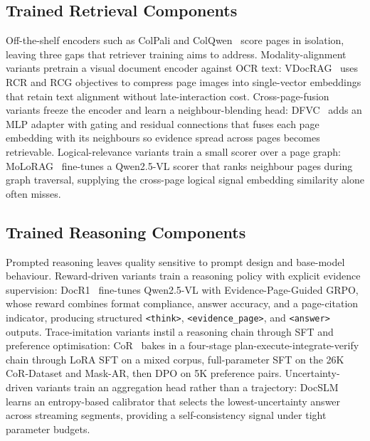 \documentclass[11pt]{article}
\begin{document}
\subsection{Trained Retrieval Components}
\label{sec:train-retrieval}
Off-the-shelf encoders such as ColPali and ColQwen~\cite{Faysse2024-wq} score pages in isolation, leaving three gaps that retriever training aims to address. Modality-alignment variants pretrain a visual document encoder against OCR text: VDocRAG~\cite{tanaka2025vdocrag} uses RCR and RCG objectives to compress page images into single-vector embeddings that retain text alignment without late-interaction cost. Cross-page-fusion variants freeze the encoder and learn a neighbour-blending head: DFVC~\cite{qian2026accurate} adds an MLP adapter with gating and residual connections that fuses each page embedding with its neighbours so evidence spread across pages becomes retrievable. Logical-relevance variants train a small scorer over a page graph: MoLoRAG~\cite{wu2025molorag} fine-tunes a Qwen2.5-VL scorer that ranks neighbour pages during graph traversal, supplying the cross-page logical signal embedding similarity alone often misses.


\subsection{Trained Reasoning Components} %
\label{sec:train-reasoning}
Prompted reasoning leaves quality sensitive to prompt design and base-model behaviour. Reward-driven variants train a reasoning policy with explicit evidence supervision: DocR1~\cite{xiong2026docr1} fine-tunes Qwen2.5-VL with Evidence-Page-Guided GRPO, whose reward combines format compliance, answer accuracy, and a page-citation indicator, producing structured \texttt{<think>}, \texttt{<evidence\_page>}, and \texttt{<answer>} outputs. Trace-imitation variants instil a reasoning chain through SFT and preference optimisation: CoR~\cite{guo2026end} bakes in a four-stage plan-execute-integrate-verify chain through LoRA SFT on a mixed corpus, full-parameter SFT on the 26K CoR-Dataset and Mask-AR, then DPO on 5K preference pairs. Uncertainty-driven variants train an aggregation head rather than a trajectory: DocSLM~\cite{hannan2025docslm} learns an entropy-based calibrator that selects the lowest-uncertainty answer across streaming segments, providing a self-consistency signal under tight parameter budgets.
\end{document}
